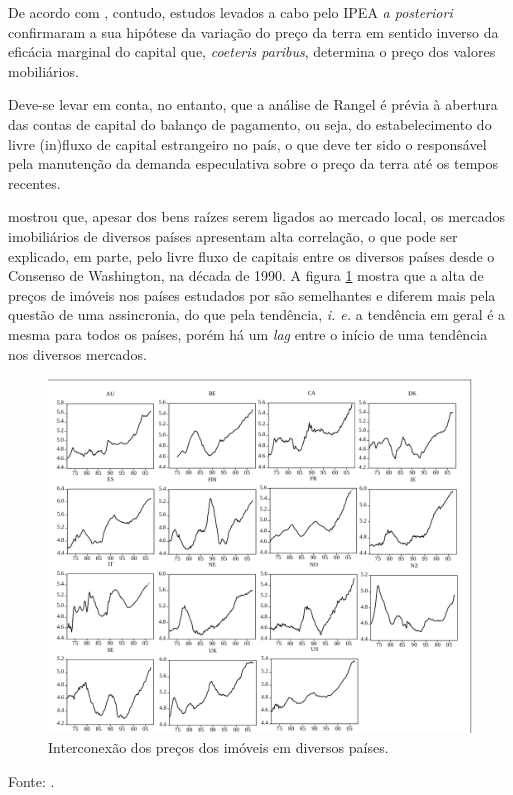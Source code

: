\documentclass[
	12pt,				%
	oneside,			%
	a4paper,			%
	chapter=TITLE,		%
	section=TITLE,		%
	english,			%
	brazil				%
	]{abntex2}
\newcommand{\bcenter}{\begin{center}}
\newcommand{\ecenter}{\end{center}}
\begin{document}
De acordo com \textcite{rangel1986b}, contudo, estudos levados a cabo
pelo IPEA \emph{a posteriori} confirmaram a sua hipótese da variação do
preço da terra em sentido inverso da eficácia marginal do capital que,
\emph{coeteris paribus}, determina o preço dos valores mobiliários.

Deve-se levar em conta, no entanto, que a análise de Rangel é prévia à
abertura das contas de capital do balanço de pagamento, ou seja, do
estabelecimento do livre (in)fluxo de capital estrangeiro no país, o que
deve ter sido o responsável pela manutenção da demanda especulativa
sobre o preço da terra até os tempos recentes.

\textcite{ADAMS201038} mostrou que, apesar dos bens raízes serem ligados
ao mercado local, os mercados imobiliários de diversos países apresentam
alta correlação, o que pode ser explicado, em parte, pelo livre fluxo de
capitais entre os diversos países desde o Consenso de Washington, na
década de 1990. A figura \ref{fig:adams2} mostra que a alta de preços de
imóveis nos países estudados por \textcite{ADAMS201038} são semelhantes
e diferem mais pela questão de uma assincronia, do que pela tendência,
\emph{i. e.} a tendência em geral é a mesma para todos os países, porém
há um \emph{lag} entre o início de uma tendência nos diversos mercados.
\begin{figure}[H]

{\centering \includegraphics[width=\textwidth]{./images/adams2_crop} 

}

\caption{Interconexão dos preços dos imóveis em diversos países.}\label{fig:adams2}
\end{figure}
\bcenter
Fonte: \textcite{ADAMS201038}. \ecenter
\end{document}
